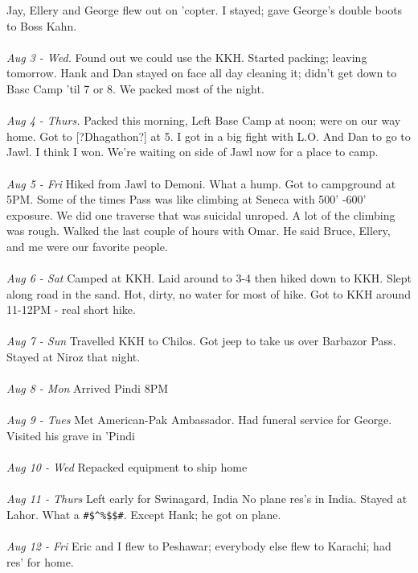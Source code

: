 \documentclass[10pt,a4paper]{article}
\begin{document}
\begin{multicols}{2}
Jay, Ellery and George flew out on 'copter.  I stayed; gave George's double boots to Boss Kahn.
\\
\\
\textit{Aug 3 - Wed.}
Found out we could use the KKH.  Started packing; leaving tomorrow.  Hank and Dan stayed on face all day cleaning it; didn't get down to Basc Camp 'til 7 or 8.  We packed most of the night.
\\
\\
\textit{Aug 4 - Thurs.}
Packed this morning, Left Base Camp at noon; were on our way home.  Got to [?Dhagathon?]
at 5.  I got in a big fight with L.O. And Dan to go to Jawl.  I think I won.  We're waiting on side of Jawl now for a place to camp.
\\
\\
\textit{Aug 5 - Fri }
Hiked from Jawl to Demoni.  What a hump.  Got to campground at 5PM.  Some of the times Pass was like climbing at Seneca with 500' -600' exposure.  We did one traverse that was suicidal unroped.  A lot of the climbing was rough. Walked the last couple of hours with Omar.  He said Bruce, Ellery, and me were our favorite people.
\\
\\
\textit{Aug 6 - Sat }
Camped at KKH.   Laid around to 3-4 then hiked down to KKH.  Slept along road in the sand.  Hot, dirty, no water for most of hike.  Got to KKH around 11-12PM - real short hike.
\\
\\
\textit{Aug 7 - Sun}
Travelled KKH to Chilos.  Got jeep to take us over Barbazor Pass.  Stayed at Niroz that night.
\\
\\
\textit{Aug 8 - Mon}
Arrived Pindi 8PM
\\
\\
\textit{Aug 9 - Tues }
Met American-Pak Ambassador.  Had funeral service for George.  Visited his grave in 'Pindi
\\
\\
\textit{Aug 10 - Wed }
Repacked equipment to ship home
\\
\\
\textit{Aug 11 - Thurs }
Left early for Swinagard, India  No plane res's in India.  Stayed at Lahor.  What a \verb+#$^%$$#+.
Except Hank; he got on plane.
\\
\\
\textit{Aug 12 - Fri }
Eric and I flew to Peshawar; everybody else flew to Karachi; had res' for home.
\\
\\

\end{multicols}
\end{document}
